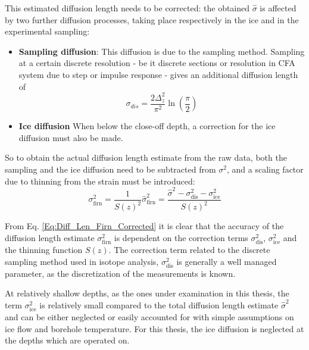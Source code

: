 \documentclass[../../CompleteThesis2/Complete_2ndDraft]{subfiles}
\begin{document}
This estimated diffusion length needs to be corrected: the obtained $\hat{\sigma}$ is affected by two further diffusion processes, taking place respectively in the ice and in the experimental sampling:
\begin{itemize}
	\item \textbf{Sampling diffusion}: This diffusion is due to the sampling method. Sampling at a certain discrete resolution - be it discrete sections or resolution in CFA system due to step or impulse response - gives an additional diffusion length of
	\begin{equation}
		\sigma_{dis} = \frac{2 \Delta_z^2}{\pi^2}\ln\left(\frac{\pi}{2}\right)
		\label{Eq:Diff_Len_corr_Discrete}
	\end{equation}
	\item \textbf{Ice diffusion} When below the close-off depth, a correction for the ice diffusion must also be made.
\end{itemize} 

So to obtain the actual diffusion length estimate from the raw data, both the sampling and the ice diffusion need to be subtracted from $\sigma^2$, and a scaling factor due to thinning from the strain must be introduced:
\begin{equation}
	\sigma_{\text{firn}}^2 = \frac{1}{S(z)^2}\hat{\sigma}_{\text{firn}}^2 = \frac{\hat{\sigma}^2 - \sigma_{\text{dis}}^2 - \sigma_{\text{ice}}^2}{S(z)^2}
	\label{Eq:Diff_Len_Firn_Corrected}
\end{equation}

From Eq. \ref{Eq:Diff_Len_Firn_Corrected} it is clear that the accuracy of the diffusion length estimate $\sigma_{\text{firn}}^2$ is dependent on the correction terms $\sigma_{\text{dis}}^2$, $\sigma_{\text{ice}}^2$ and the thinning function $S(z)$. The correction term related to the discrete sampling method used in isotope analysis, $\sigma_{\text{dis}}^2$ is generally a well managed parameter, as the discretization of the measurements is known. 

At relatively shallow depths, as the ones under examination in this thesis, the term $\sigma_{\text{ice}}^2$ is relatively small compared to the total diffusion length estimate $\hat{\sigma}^2$ and can be either neglected or easily accounted for with simple assumptions on ice flow and borehole temperature. For this thesis, the ice diffusion is neglected at the depths which are operated on.
\end{document}
